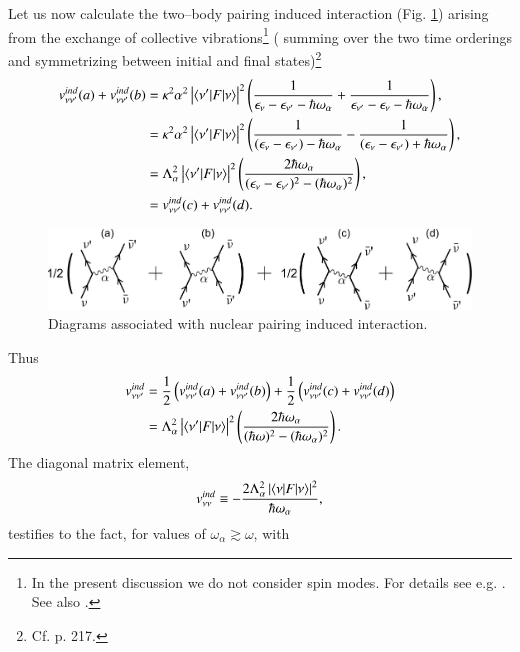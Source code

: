 \begin{subappendices}
Let us now calculate the two--body pairing induced interaction (Fig. \ref{fig3.A.2}) arising from the exchange of collective vibrations\footnote{In the present discussion we do not consider spin modes. For details see e.g. \cite{Idini:15}. See also \cite{Bortignon:83}.} ( summing over the two time orderings and symmetrizing between initial and final states)\footnote{Cf. \cite{Brink:05} p. 217.}
\begin{align}
\nonumber v_{\nu\nu'}^{ind}(a)+v_{\nu\nu'}^{ind}(b)&=\kappa^2\alpha^2\left|\langle {\nu'|F|\nu} \rangle\right|^2\left(\frac{1}{\epsilon_\nu-\epsilon_{\nu'}-\hbar\omega_\alpha}+\frac{1}{\epsilon_{\nu'}-\epsilon_{\nu}-\hbar\omega_\alpha}\right),\\
\nonumber &=\kappa^2\alpha^2\left|\langle {\nu'|F|\nu} \rangle\right|^2\left(\frac{1}{(\epsilon_\nu-\epsilon_{\nu'})-\hbar\omega_\alpha}-\frac{1}{(\epsilon_{\nu}-\epsilon_{\nu'})+\hbar\omega_\alpha}\right),\\
\nonumber &=\Lambda_\alpha^2\left|\langle {\nu'|F|\nu} \rangle\right|^2\left(\frac{2\hbar\omega_\alpha}{(\epsilon_\nu-\epsilon_{\nu'})^2-(\hbar\omega_\alpha)^2}\right),\\
&=v_{\nu\nu'}^{ind}(c)+v_{\nu\nu'}^{ind}(d).
\end{align}
   \begin{figure}
   \centerline{\includegraphics*[width=12cm,angle=0	]{nutshell/figs/fig3_A_2}}
   \caption{Diagrams associated with nuclear pairing induced interaction.}\label{fig3.A.2}
   \end{figure}
Thus
\begin{align}\label{eq3.A.17}
\nonumber v_{\nu\nu'}^{ind}&=\frac{1}{2}\left(v_{\nu\nu'}^{ind}(a)+v_{\nu\nu'}^{ind}(b)\right)+\frac{1}{2}\left(v_{\nu\nu'}^{ind}(c)+v_{\nu\nu'}^{ind}(d)\right)\\ &=\Lambda_\alpha^2\left|\langle {\nu'|F|\nu} \rangle\right|^2\left(\frac{2\hbar\omega_\alpha}{(\hbar\omega)^2-(\hbar\omega_\alpha)^2}\right).
\end{align}
The diagonal matrix element,
\begin{align}
\nonumber v_{\nu\nu}^{ind}\equiv-\frac{2\Lambda_\alpha^2\left|\langle {\nu|F|\nu} \rangle\right|^2}{\hbar\omega_\alpha},
\end{align}
testifies to the fact, for values of $\omega_\alpha\gtrsim\omega$, with

\end{subappendices}
